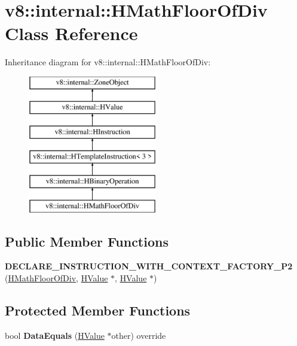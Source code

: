 \hypertarget{classv8_1_1internal_1_1_h_math_floor_of_div}{}\section{v8\+:\+:internal\+:\+:H\+Math\+Floor\+Of\+Div Class Reference}
\label{classv8_1_1internal_1_1_h_math_floor_of_div}
Inheritance diagram for v8\+:\+:internal\+:\+:H\+Math\+Floor\+Of\+Div\+:\begin{figure}[H]
\begin{center}
\leavevmode
\includegraphics[height=6.000000cm]{classv8_1_1internal_1_1_h_math_floor_of_div}
\end{center}
\end{figure}
\subsection*{Public Member Functions}
\begin{DoxyCompactItemize}
\item 
{\bfseries D\+E\+C\+L\+A\+R\+E\+\_\+\+I\+N\+S\+T\+R\+U\+C\+T\+I\+O\+N\+\_\+\+W\+I\+T\+H\+\_\+\+C\+O\+N\+T\+E\+X\+T\+\_\+\+F\+A\+C\+T\+O\+R\+Y\+\_\+\+P2} (\hyperlink{classv8_1_1internal_1_1_h_math_floor_of_div}{H\+Math\+Floor\+Of\+Div}, \hyperlink{classv8_1_1internal_1_1_h_value}{H\+Value} $\ast$, \hyperlink{classv8_1_1internal_1_1_h_value}{H\+Value} $\ast$)\hypertarget{classv8_1_1internal_1_1_h_math_floor_of_div_ac1987bb6d549bd87ddad2285c5d520bb}{}\label{classv8_1_1internal_1_1_h_math_floor_of_div_ac1987bb6d549bd87ddad2285c5d520bb}

\end{DoxyCompactItemize}
\subsection*{Protected Member Functions}
\begin{DoxyCompactItemize}
\item 
bool {\bfseries Data\+Equals} (\hyperlink{classv8_1_1internal_1_1_h_value}{H\+Value} $\ast$other) override\hypertarget{classv8_1_1internal_1_1_h_math_floor_of_div_aaeb81eda4badb259bad13e3310d83dda}{}\label{classv8_1_1internal_1_1_h_math_floor_of_div_aaeb81eda4badb259bad13e3310d83dda}

\end{DoxyCompactItemize}

